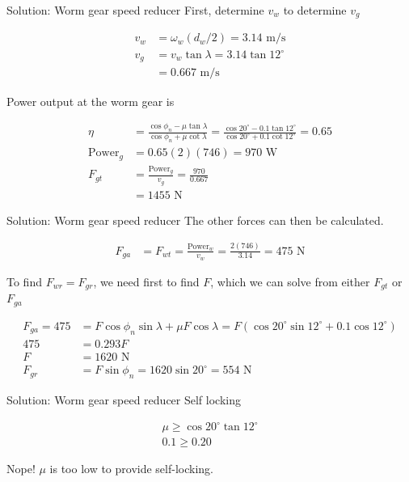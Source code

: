 \documentclass[10pt, svgnames]{beamer}
\begin{document}
\begin{frame}[label={sec:orgcaf9224}]{Solution: Worm gear speed reducer}
First, determine \(v_{w}\) to determine \(v_{g}\)

\begin{align*}
    v_{w} &= \omega_{w} (d_{w}/2) = 3.14 \text{ m/s} \\
    v_{g} &= v_{w} \tan \lambda = 3.14 \tan 12^{\circ} \\
          &= 0.667 \text{ m/s}
\end{align*}

Power output at the worm gear is

\begin{align*}
    \eta &= \frac{\cos \phi_{n} - \mu \tan \lambda}{\cos \phi_{n} + \mu \cot \lambda} = \frac{\cos 20^{\circ} - 0.1 \tan 12^{\circ}}{\cos 20^{\circ} + 0.1 \cot 12^{\circ}} = 0.65 \\
    \text{Power}_{g} &= 0.65(2)(746) = 970 \text{ W} \\
    F_{gt} &= \frac{\text{Power}_{g}}{v_{g}} = \frac{970}{0.667} \\
         &= 1455 \text{ N}
\end{align*}
\end{frame}

\begin{frame}[label={sec:org70fd788}]{Solution: Worm gear speed reducer}
The other forces can then be calculated.

\begin{align*}
    F_{ga} &= F_{wt} = \frac{\text{Power}_{w}}{v_{w}} = \frac{2(746)}{3.14} = 475 \text{ N}
\end{align*}

To find \(F_{wr} = F_{gr}\), we need first to find \(F\), which we can
solve from either \(F_{gt}\) or \(F_{ga}\)

\begin{align*}
    F_{ga} = 475 &= F \cos \phi_{n} \sin \lambda + \mu F \cos \lambda = F \left( \cos 20^{\circ} \sin 12^{\circ} + 0.1 \cos 12^{\circ} \right) \\
    475 &= 0.293F \\
    F &= 1620 \text{ N} \\
    F_{gr} &= F \sin \phi_{n} = 1620 \sin 20^{\circ} = 554 \text{ N}
\end{align*}
\end{frame}

\begin{frame}[label={sec:org4901099}]{Solution: Worm gear speed reducer}
Self locking

\begin{align*}
    \mu \geqslant \cos 20^{\circ} \tan 12^{\circ} \\
    0.1 \geqslant 0.20
\end{align*}

Nope! \(\mu\) is too low to provide self-locking.
\end{frame}
\end{document}
